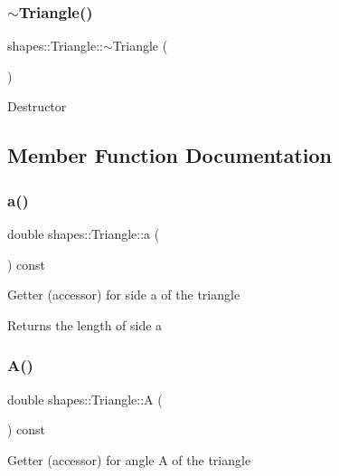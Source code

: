 \subsubsection{\texorpdfstring{$\sim$Triangle()}{~Triangle()}}
{\footnotesize\ttfamily shapes\+::\+Triangle\+::$\sim$\+Triangle (\begin{DoxyParamCaption}{ }\end{DoxyParamCaption})\hspace{0.3cm}{\ttfamily [inline]}}

Destructor 

\subsection{Member Function Documentation}
\mbox{\label{classshapes_1_1Triangle_acdb468a706e3aba4c133af15e0ab5113}} 
\subsubsection{\texorpdfstring{a()}{a()}}
{\footnotesize\ttfamily double shapes\+::\+Triangle\+::a (\begin{DoxyParamCaption}{ }\end{DoxyParamCaption}) const\hspace{0.3cm}{\ttfamily [inline]}}

Getter (accessor) for side a of the triangle

\begin{DoxyReturn}{Returns}
the length of side a 
\end{DoxyReturn}
\mbox{\label{classshapes_1_1Triangle_a824b7330173b7d71fa3fb362d6a53593}} 
\subsubsection{\texorpdfstring{A()}{A()}}
{\footnotesize\ttfamily double shapes\+::\+Triangle\+::A (\begin{DoxyParamCaption}{ }\end{DoxyParamCaption}) const\hspace{0.3cm}{\ttfamily [inline]}}

Getter (accessor) for angle A of the triangle

